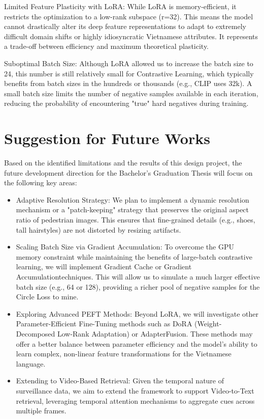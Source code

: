 \documentclass[../main.tex]{subfiles}
\begin{document}
Limited Feature Plasticity with LoRA: While LoRA is memory-efficient, it restricts the optimization to a low-rank subspace (r=32). This means the model cannot drastically alter its deep feature representations to adapt to extremely difficult domain shifts or highly idiosyncratic Vietnamese attributes. It represents a trade-off between efficiency and maximum theoretical plasticity.

Suboptimal Batch Size: Although LoRA allowed us to increase the batch size to 24, this number is still relatively small for Contrastive Learning, which typically benefits from batch sizes in the hundreds or thousands (e.g., CLIP uses 32k). A small batch size limits the number of negative samples available in each iteration, reducing the probability of encountering "true" hard negatives during training.

\section{Suggestion for Future Works }

Based on the identified limitations and the results of this design project, the future development direction for the Bachelor’s Graduation Thesis will focus on the following key areas:
\begin{itemize}
\item Adaptive Resolution Strategy: We plan to implement a dynamic resolution mechanism or a "patch-keeping" strategy that preserves the original aspect ratio of pedestrian images. This ensures that fine-grained details (e.g., shoes, tall hairstyles) are not distorted by resizing artifacts.

\item Scaling Batch Size via Gradient Accumulation: To overcome the GPU memory constraint while maintaining the benefits of large-batch contrastive learning, we will implement Gradient Cache or Gradient Accumulationtechniques. This will allow us to simulate a much larger effective batch size (e.g., 64 or 128), providing a richer pool of negative samples for the Circle Loss to mine.

\item Exploring Advanced PEFT Methods: Beyond LoRA, we will investigate other Parameter-Efficient Fine-Tuning methods such as DoRA (Weight-Decomposed Low-Rank Adaptation) or AdapterFusion. These methods may offer a better balance between parameter efficiency and the model's ability to learn complex, non-linear feature transformations for the Vietnamese language.

\item Extending to Video-Based Retrieval: Given the temporal nature of surveillance data, we aim to extend the framework to support Video-to-Text retrieval, leveraging temporal attention mechanisms to aggregate cues across multiple frames. 
\end{itemize}
\end{document}
